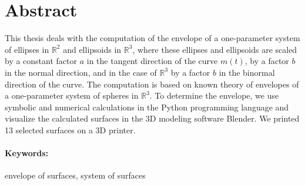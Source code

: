 \documentclass[12pt, twoside]{book}
\theoremstyle{definition}
\begin{document}
\section*{Abstract} 
\noindent This thesis deals with the computation of the envelope of a one-parameter system of ellipses in $\mathbb{R}^2$ and ellipsoids in $\mathbb{R}^3$, where these ellipses and ellipsoids are scaled by a constant factor $a$ in the tangent direction of the curve $m(t)$, by a factor $b$ in the normal direction, and in the case of $\mathbb{R}^3$ by a factor $b$ in the binormal direction of the curve. The computation is based on known  theory of envelopes of a one-parameter system of spheres in $\mathbb{R}^3$. To determine the envelope, we use symbolic and numerical calculations in the Python programming language and visualize the calculated surfaces in the 3D modeling software Blender. We printed 13 selected surfaces on a 3D printer.


\paragraph*{Keywords:} envelope of surfaces, system of surfaces


%
%



\newpage 

\tableofcontents



\newpage 
\listoffigures
\listoftables
\end{document}
